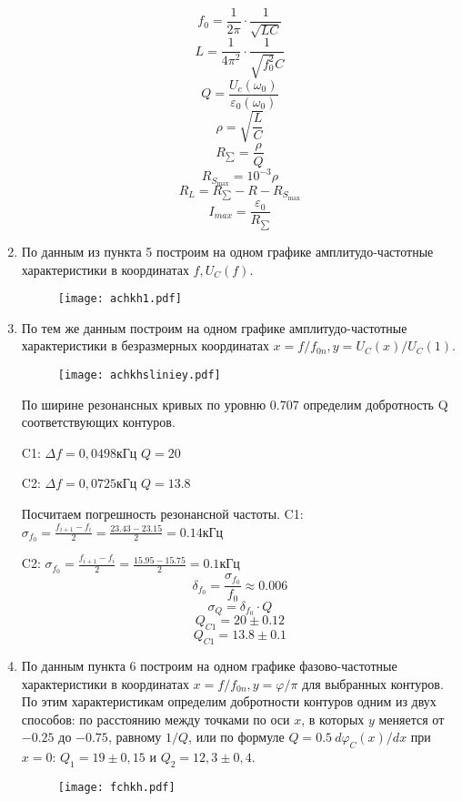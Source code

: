 \documentclass[a4paper,12pt]{extreport}
\begin{document}
\begin{enumerate}
$$f_0 =\frac{1}{2\pi }\cdot \frac{1}{\sqrt{LC}}$$
$$L = \frac{1}{4\pi^{2}}\cdot \frac{1}{\sqrt{f_{0}^{2}}C}$$
$$Q = \frac{U_c(\omega _0)}{\varepsilon _0(\omega _0)}$$
$$\rho = \sqrt{\frac{L}{C}}$$
$$R_{\sum} = \frac{\rho }{Q}$$
$$R_{S_{\max}}=10^{-3}\rho $$
$$R_{L} = R_{\sum} - R - R_{S_{\max}}$$
$$I_{max} = \frac{\varepsilon _0}{R_{\sum}}$$

\item По данным из пункта 5 построим на одном графике амплитудо-частотные характеристики в координатах $f, U_C(f)$.
\begin{center}
	\begin{figure}[ht!]
		\centering
		\texttt{[image: achkh1.pdf]}
		\label{C}
	\end{figure}
	 
\end{center}
\item По тем же данным построим на одном графике амплитудо-частотные характеристики в безразмерных координатах $x = f/f_{0n}, y = U_C(x)/U_C(1)$. 
\begin{center}
	\begin{figure}[ht!]
		\centering
		\texttt{[image: achkhsliniey.pdf]}
		\label{C}
	\end{figure}
	 
\end{center}
По ширине резонансных кривых по уровню 0.707 определим добротность Q соответствующих контуров.


C1:
$\Delta f = 0,0498 $кГц
$Q = 20$


C2:
$\Delta f = 0,0725 $кГц
$Q = 13.8$


Посчитаем погрешность резонансной частоты.
C1: $\sigma_{f_0} = \frac{f_{i+1} - f_{i}}{2} = \frac{23.43-23.15}{2} =  0.14 кГц$


C2: $\sigma_{f_0} = \frac{f_{i+1} - f_{i}}{2} = \frac{15.95-15.75}{2} =  0.1 кГц$
$$\delta_{f_0} = \frac{\sigma_{f_0}}{f_0} \approx 0.006$$
$$\sigma_{Q} = \delta_{f_0} \cdot Q$$
$$ Q_{C1} = 20\pm 0.12$$
$$ Q_{C1} = 13.8\pm 0.1$$


\item По данным пункта 6 построим на одном графике фазово-частотные характеристики в координатах $x = f/f_{0n}, y = \varphi /\pi$ для выбранных контуров. По этим характеристикам определим добротности контуров одним из двух способов: по расстоянию между
точками по оси $x$, в которых $y$ меняется от $-0.25$ до $-0.75$, равному $1/Q$, или по формуле $Q = 0.5~d\varphi_C(x)/dx$ при $x=0$: $Q_1 = 19 \pm 0,15$ и $Q_2 = 12,3 \pm 0,4$.
\begin{center}
	\begin{figure}[ht!]
		\centering
		\texttt{[image: fchkh.pdf]}
		\label{C}
	\end{figure}
	 


\end{center}
\end{enumerate}
\end{document}
